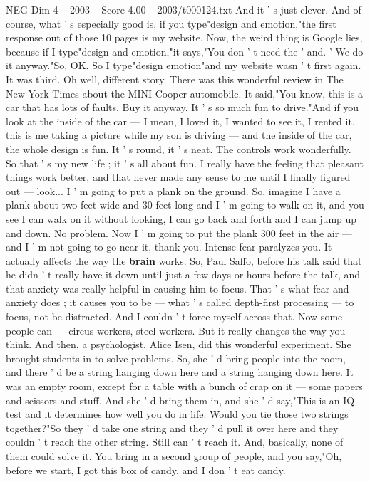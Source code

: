 \begin{textsample}{NEG Dim 4 – 2003 – Score 4.00 – 2003/t000124.txt}
And it ' s just clever.
And of course, what ' s especially good is, if you type"design and emotion,"the first response out of those 10 pages is my website.
Now, the weird thing is Google lies, because if I type"design and emotion,"it says,"You don ' t need the ' and. ' We do it anyway."So, OK.
So I type"design emotion"and my website wasn ' t first again.
It was third.
Oh well, different story.
There was this wonderful review in The New York Times about the MINI Cooper automobile.
It said,"You know, this is a car that has lots of faults.
Buy it anyway.
It ' s so much fun to drive."And if you look at the inside of the car — I mean, I loved it, I wanted to see it, I rented it, this is me taking a picture while my son is driving — and the inside of the car, the whole design is fun.
It ' s round, it ' s neat.
The controls work wonderfully.
So that ' s my new life ; it ' s all about fun.
I really have the feeling that pleasant things work better, and that never made any sense to me until I finally figured out — look...
I ' m going to put a plank on the ground.
So, imagine I have a plank about two feet wide and 30 feet long and I ' m going to walk on it, and you see I can walk on it without looking, I can go back and forth and I can jump up and down.
No problem.
Now I ' m going to put the plank 300 feet in the air — and I ' m not going to go near it, thank you.
Intense fear paralyzes you.
It actually affects the way the \textbf{brain} works.
So, Paul Saffo, before his talk said that he didn ' t really have it down until just a few days or hours before the talk, and that anxiety was really helpful in causing him to focus.
That ' s what fear and anxiety does ; it causes you to be — what ' s called depth-first processing — to focus, not be distracted.
And I couldn ' t force myself across that.
Now some people can — circus workers, steel workers.
But it really changes the way you think.
And then, a psychologist, Alice Isen, did this wonderful experiment.
She brought students in to solve problems.
So, she ' d bring people into the room, and there ' d be a string hanging down here and a string hanging down here.
It was an empty room, except for a table with a bunch of crap on it — some papers and scissors and stuff.
And she ' d bring them in, and she ' d say,"This is an IQ test and it determines how well you do in life.
Would you tie those two strings together?"So they ' d take one string and they ' d pull it over here and they couldn ' t reach the other string.
Still can ' t reach it.
And, basically, none of them could solve it.
You bring in a second group of people, and you say,"Oh, before we start, I got this box of candy, and I don ' t eat candy.

\end{textsample}
